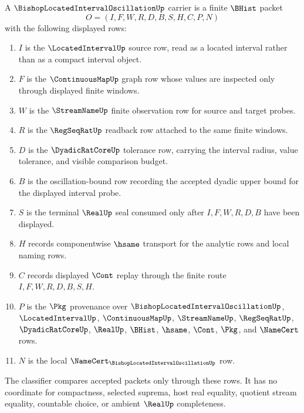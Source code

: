 \begin{definition}
\label{def:bishop-located-interval-oscillation-carrier}
A $\BishopLocatedIntervalOscillationUp$ carrier is a finite $\BHist$ packet
$$
O=(I,F,W,R,D,B,S,H,C,P,N)
$$
with the following displayed rows:
\begin{enumerate}
\item $I$ is the $\LocatedIntervalUp$ source row, read as a located interval rather than as a compact interval object.
\item $F$ is the $\ContinuousMapUp$ graph row whose values are inspected only through displayed finite windows.
\item $W$ is the $\StreamNameUp$ finite observation row for source and target probes.
\item $R$ is the $\RegSeqRatUp$ readback row attached to the same finite windows.
\item $D$ is the $\DyadicRatCoreUp$ tolerance row, carrying the interval radius, value tolerance, and visible comparison budget.
\item $B$ is the oscillation-bound row recording the accepted dyadic upper bound for the displayed interval probe.
\item $S$ is the terminal $\RealUp$ seal consumed only after $I,F,W,R,D,B$ have been displayed.
\item $H$ records componentwise $\hsame$ transport for the analytic rows and local naming rows.
\item $C$ records displayed $\Cont$ replay through the finite route $I,F,W,R,D,B,S,H$.
\item $P$ is the $\Pkg$ provenance over $\BishopLocatedIntervalOscillationUp$, $\LocatedIntervalUp$, $\ContinuousMapUp$, $\StreamNameUp$, $\RegSeqRatUp$, $\DyadicRatCoreUp$, $\RealUp$, $\BHist$, $\hsame$, $\Cont$, $\Pkg$, and $\NameCert$ rows.
\item $N$ is the local $\NameCert_{\BishopLocatedIntervalOscillationUp}$ row.
\end{enumerate}
The classifier compares accepted packets only through these rows. It has no coordinate for compactness, selected suprema, host real equality, quotient stream equality, countable choice, or ambient $\RealUp$ completeness.
\end{definition}

